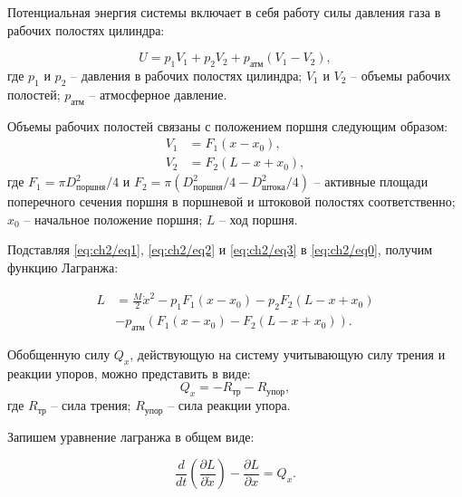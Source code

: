 Потенциальная энергия системы включает в себя работу силы давления газа в рабочих полостях цилиндра:

\begin{equation}\label{eq:ch2/eq2}
    U = p_1 V_1 + p_2 V_2 + p_\text{атм} (V_1 - V_2),
\end{equation}
где $p_1$ и $p_2$ -- давления в рабочих полостях цилиндра;
$V_1$ и $V_2$ -- объемы рабочих полостей;
$p_\text{атм}$ -- атмосферное давление.

Объемы рабочих полостей связаны с положением поршня следующим образом:
\begin{equation}\label{eq:ch2/eq3}
    \begin{aligned}
        V_1 & = F_1 (x - x_0),     \\
        V_2 & = F_2 (L - x + x_0),
    \end{aligned}
\end{equation}
где $F_1=\pi D_{поршня}^2/4 $ и $F_2 = \pi (D_{поршня}^2/4 - D_{штока}^2/4)$ -- активные площади поперечного сечения поршня в поршневой и штоковой полостях соответственно;
$x_0$ -- начальное положение поршня;
$L$ -- ход поршня.

Подставляя \eqref{eq:ch2/eq1}, \eqref{eq:ch2/eq2} и \eqref{eq:ch2/eq3} в \eqref{eq:ch2/eq0}, получим функцию Лагранжа:

\begin{equation}\label{eq:ch2/eq4}
    \begin{aligned}
        L & = \frac{M}{2} \dot{x}^2 - p_1 F_1 (x - x_0) - p_2 F_2 (L - x + x_0) \\
          & - p_\text{атм} (F_1 (x - x_0) - F_2 (L - x + x_0)).
    \end{aligned}
\end{equation}

Обобщенную силу $Q_x$, действующую на систему учитывающую силу трения и реакции упоров, можно представить в виде:
\begin{equation}\label{eq:ch2/eq5}
    Q_x = - R_{\text{тр}} - R_{\text{упор}},
\end{equation}
где $R_{\text{тр}}$ -- сила трения; $R_{\text{упор}}$ -- сила реакции упора.

Запишем уравнение лагранжа в общем виде:

\begin{equation}\label{eq:ch2/eq6}
    \frac{d}{dt} \left( \frac{\partial L}{\partial \dot{x}} \right) - \frac{\partial L}{\partial x} = Q_x.
\end{equation}

